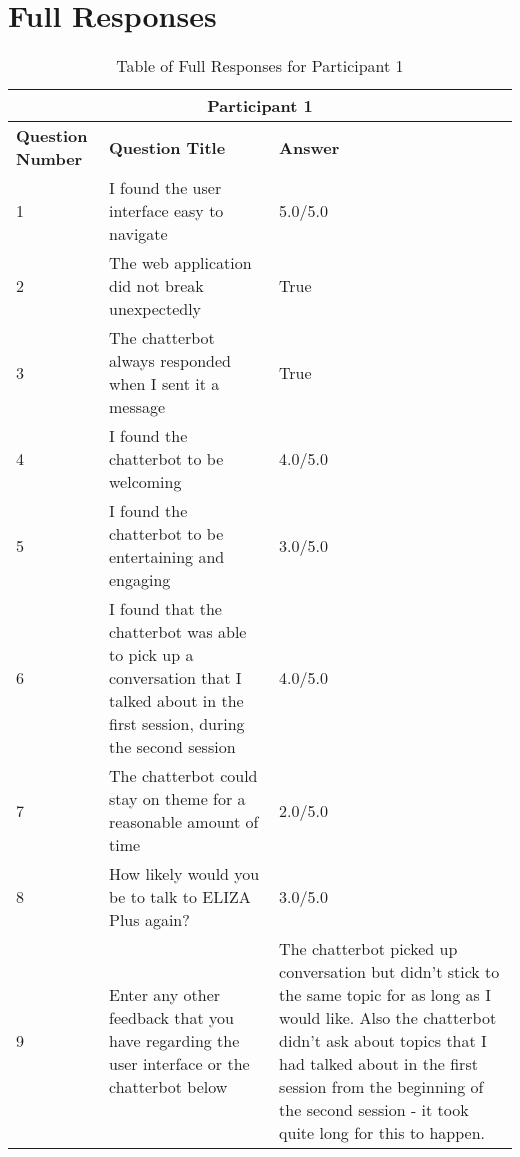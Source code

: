 \section{Full Responses}
\renewcommand{\arraystretch}{3}
\begin{table}[H]
	\centering
	\begin{tabular}{ |m{1.8cm}|m{6.5cm}| m{7cm}|} 
		\hline
		\multicolumn{3}{|c|}{Participant 1} \\
		\hline
		\textbf{Question Number} & \textbf{Question Title} & \textbf{Answer}\\ 
		\hline
		1 & I found the user interface easy to navigate & 5.0/5.0\\ 
		\hline
		2 & 
		The web application did not break unexpectedly & True \\ 
		\hline
		3 & The chatterbot always responded when I sent it a message & True\\
		\hline 
		4 & I found the chatterbot to be welcoming & 4.0/5.0\\
		\hline
		5 & I found the chatterbot to be entertaining and engaging & 3.0/5.0\\
		\hline
		6 & I found that the chatterbot was able to pick up a conversation that I talked about in the first session, during the second session  & 4.0/5.0\\
		\hline
		7 & The chatterbot could stay on theme for a reasonable amount of time & 2.0/5.0 \\
		\hline
		8 & 
		How likely would you be to talk to ELIZA Plus again? & 3.0/5.0\\
		\hline
		9 & 
		Enter any other feedback that you have regarding the user interface or the chatterbot below & The chatterbot picked up conversation but didn't stick to the same topic for as long as I would like. Also the chatterbot didn't ask about topics that I had talked about in the first session from the beginning of the second session - it took quite long for this to happen.\\
		\hline
	\end{tabular}
	\caption{Table of Full Responses for Participant 1}
\end{table}

